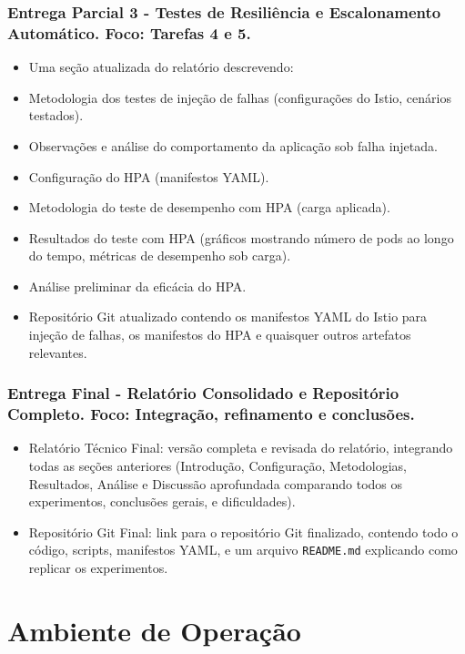 \documentclass[12pt,a4paper]{report}
\begin{document}
\subsection{Entrega Parcial 3 - Testes de Resiliência e Escalonamento Automático. Foco: Tarefas 4 e 5.}
\begin{itemize}
    \item Uma seção atualizada do relatório descrevendo:
    \item Metodologia dos testes de injeção de falhas (configurações do Istio, cenários testados).
    \item Observações e análise do comportamento da aplicação sob falha injetada.
    \item Configuração do HPA (manifestos YAML).
    \item Metodologia do teste de desempenho com HPA (carga aplicada).
    \item Resultados do teste com HPA (gráficos mostrando número de pods ao longo do tempo, métricas de desempenho sob carga).
    \item Análise preliminar da eficácia do HPA.
    \item Repositório Git atualizado contendo os manifestos YAML do Istio para injeção de falhas, os manifestos do HPA e quaisquer outros artefatos relevantes.
\end{itemize}

\subsection{Entrega Final - Relatório Consolidado e Repositório Completo. Foco: Integração, refinamento e conclusões.}
\begin{itemize}
    \item Relatório Técnico Final: versão completa e revisada do relatório, integrando todas as seções anteriores (Introdução, Configuração, Metodologias, Resultados, Análise e Discussão aprofundada comparando todos os experimentos, conclusões gerais, e dificuldades).
    \item Repositório Git Final: link para o repositório Git finalizado, contendo todo o código, scripts, manifestos YAML, e um arquivo \texttt{README.md} explicando como replicar os experimentos.
\end{itemize}


\chapter{Ambiente de Operação}
\end{document}
